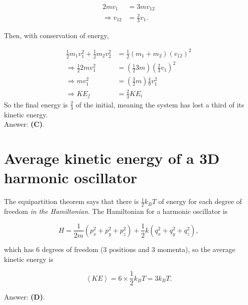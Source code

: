 \documentclass[11pt]{paper}
\newcommand{\answer}[1]{Answer: \textbf{(#1)}.}
\begin{document}
\begin{align}
2m v_1 &= 3m v_{12}\\
\Rightarrow v_{12} &= \frac{2}{3} v_1.
\end{align}

Then, with conservation of energy,

\begin{align}
\frac{1}{2} m_1 v_1^2 + \frac{1}{2} m_2 v_2^2 &= \frac{1}{2} \left(m_1 + m_2\right) (v_{12})^2\\
\Rightarrow \frac{1}{2} 2 m v_1^2  &= \left(\frac{1}{2} 3 m\right) \left(\frac{2}{3} v_1\right)^2\\
\Rightarrow m v_1^2 &= \left(\frac{3}{2}m\right) \frac{4}{9} v_1^2\\
\Rightarrow KE_f &= \frac{2}{3} KE_i
\end{align}
So the final energy is $\frac{2}{3}$ of the initial, meaning the system has lost a third of its kinetic energy.\\

\answer{C}

\section{Average kinetic energy of a 3D harmonic oscillator}
The equipartition theorem says that there is $\frac{1}{2}k_B T$ of energy for each degree of freedom \emph{in the Hamiltonian}.  The Hamiltonian for a harmonic oscillator is 

\begin{equation}
H = \frac{1}{2m} \left( p_x^2 + p_y^2 + p_z^2 \right) + \frac{1}{2} k \left( q_x^2 + q_y^2 + q_z^2 \right),
\end{equation}

which has 6 degrees of freedom (3 positions and 3 momenta), so the average kinetic energy is 

\begin{equation}
\left< KE \right>  = 6 \times \frac{1}{2} k_B T = 3 k_B T.
\end{equation}

\answer{D}
\end{document}
